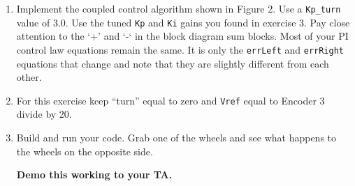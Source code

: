 \documentclass[11pt]{article}
\begin{document}
\begin{enumerate}
        \item Implement the coupled control algorithm shown in Figure 2. Use a \texttt{Kp_turn} value of 3.0. Use the tuned \texttt{Kp} and \texttt{Ki} gains you found in exercise 3. Pay close attention to the ‘+’ and ‘-‘ in the block diagram sum blocks. Most of your PI control law equations remain the same. It is only the \texttt{errLeft} and \texttt{errRight} equations that change and note that they are slightly different from each other.
        \item For this exercise keep “turn” equal to zero and \texttt{Vref} equal to Encoder 3 divide by 20.
    \item Build and run your code. Grab one of the wheels and see what happens to the wheels on the opposite side.
        \begin{checkoff}
                \textbf{Demo this working to your TA.}
        \end{checkoff}
\end{enumerate}
%
\end{document}
